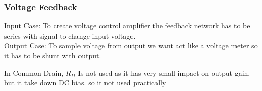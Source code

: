 \subsubsection{Voltage Feedback}
Input Case: To create voltage control amplifier the feedback network has to be series with signal to change input voltage.\\
Output Case: To sample voltage from output we want act like a voltage meter so it has to be shunt with output.
\par
\setlength{\parindent}{0.5cm} %
In Common Drain, $R_D$ Is not used as it has very small impact on output gain, but it take down DC bias. so it not used practically
\lipsum[1]
\setlength{\parindent}{0.0cm} 
